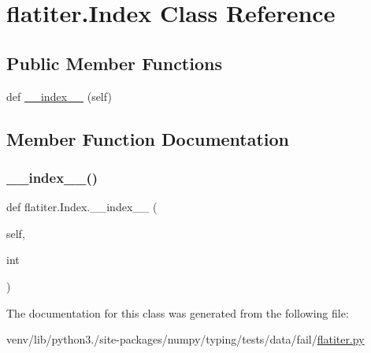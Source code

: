 \hypertarget{classflatiter_1_1Index}{}\section{flatiter.\+Index Class Reference}
\label{classflatiter_1_1Index}
\subsection*{Public Member Functions}
\begin{DoxyCompactItemize}
\item 
def \hyperlink{classflatiter_1_1Index_a01ecc2b18b004fb6e885ab26989918dc}{\+\_\+\+\_\+index\+\_\+\+\_\+} (self)
\end{DoxyCompactItemize}


\subsection{Member Function Documentation}
\mbox{\label{classflatiter_1_1Index_a01ecc2b18b004fb6e885ab26989918dc}} 
\subsubsection{\texorpdfstring{\+\_\+\+\_\+index\+\_\+\+\_\+()}{\_\_index\_\_()}}
{\footnotesize\ttfamily def flatiter.\+Index.\+\_\+\+\_\+index\+\_\+\+\_\+ (\begin{DoxyParamCaption}\item[{}]{self,  }\item[{}]{int }\end{DoxyParamCaption})}



The documentation for this class was generated from the following file\+:\begin{DoxyCompactItemize}
\item 
venv/lib/python3./site-\/packages/numpy/typing/tests/data/fail/\hyperlink{fail_2flatiter_8py}{flatiter.\+py}\end{DoxyCompactItemize}
